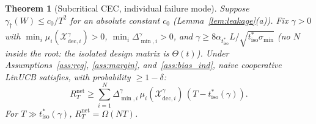 \documentclass[11pt]{article}
\newtheorem{theorem}{Theorem}[section]
\begin{document}
\begin{theorem}[Subcritical CEC, individual failure mode]
\label{thm:cec_sub}
Suppose $\gamma_\dagger(W)\leq c_0/T^2$ for an absolute constant $c_0$
(Lemma~\ref{lem:leakage}(a)).
Fix $\gamma>0$ with $\min_i\mu_i(\mathcal{X}_{\mathrm{dec},i}^\gamma)>0$,
$\min_i\Delta_{\min,i}^\gamma>0$, and
$\gamma\geq 8\alpha_{t_{\mathrm{iso}}^*}L/\sqrt{t_{\mathrm{iso}}^*\sigma_{\min}}$
(no $N$ inside the root: the isolated design matrix is $\Theta(t)$).
Under Assumptions~\ref{ass:reg}, \ref{ass:margin}, and~\ref{ass:bias_ind},
naive cooperative LinUCB satisfies, with probability $\geq 1-\delta$:
\begin{equation}
R_T^{\mathrm{net}}\geq\sum_{i=1}^N\Delta_{\min,i}^\gamma\,
\mu_i(\mathcal{X}_{\mathrm{dec},i}^\gamma)\,(T-t_{\mathrm{iso}}^*(\gamma)).
\label{eq:cec_sub}
\end{equation}
For $T\gg t_{\mathrm{iso}}^*(\gamma)$, $R_T^{\mathrm{net}}=\Omega(NT)$.
\end{theorem}
\end{document}
